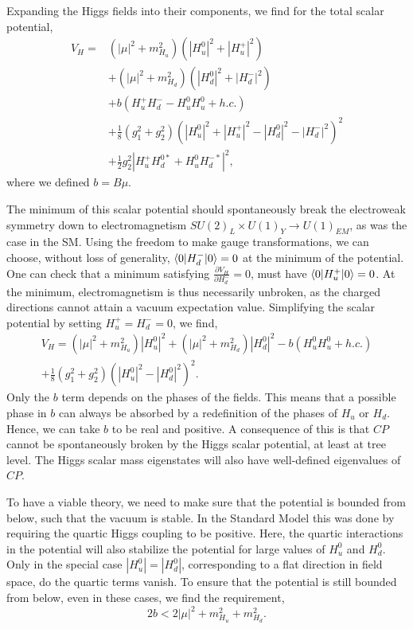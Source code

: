 Expanding the Higgs fields into their components, we find for the total scalar potential,
\begin{align}
  V_H = & \left( |\mu|^2 + m_{H_u}^2 \right)\left( |H_u^0|^2 + |H_u^+|^2 \right) \\
	& + \left( |\mu|^2 + m_{H_d}^2 \right)\left( |H_d^0|^2 + |H_d^-|^2 \right) \\
     & + b\left( H_u^+ H_d^- - H_u^0 H_u^0 + h.c.\right)  \\
     & + \frac{1}{8} \left( g_1^2 + g_2^2 \right) \left( |H_u^0|^2 + |H_u^+|^2 - |H_d^0|^2 -
|H_d^-|^2 \right)^2 \\
    & + \frac{1}{2} g_2^2 |H_u^+ H_d^{0*} + H_u^0 H_d^{-*}|^2 ,
\end{align}
where we defined $b = B \mu$.


The minimum of this scalar potential should spontaneously break the electroweak symmetry down to
electromagnetism $SU(2)_L \times U(1)_Y \rightarrow U(1)_{EM}$, as was the case in the SM. 
Using the freedom to make gauge transformations, we can choose, without loss of generality,
$\braket{0|H_d^-|0} = 0$ at the minimum of the potential. 
One can check that a minimum satisfying $\frac{\partial V_H}{\partial H_d^-} = 0$, must have
$\braket{0|H_u^+|0} = 0$. At the minimum, electromagnetism is thus necessarily unbroken, as the
charged directions cannot attain a vacuum expectation value.
Simplifying the scalar potential by setting $H_u^+ = H_d^- = 0$, we find,
\begin{multline}
  V_H = \left( |\mu|^2 + m_{H_u}^2 \right) |H_u^0|^2  + \left( |\mu|^2 + m_{H_d}^2 \right)
|H_d^0|^2 - b\left( H_u^0 H_u^0 + h.c.\right)  \\
      + \frac{1}{8} \left( g_1^2 + g_2^2 \right) \left( |H_u^0|^2  - |H_d^0|^2 \right)^2 .
\end{multline}
Only the $b$ term depends on the phases of the fields. This means that a possible phase in $b$ can
always be absorbed by a redefinition of the phases of $H_u$ or $H_d$. Hence, we can take $b$ to be
real and positive. A consequence of this is that $CP$ cannot be spontaneously broken by the Higgs
scalar potential, at least at tree level. The Higgs scalar mass eigenstates will also have
well-defined eigenvalues of $CP$. 

To have a viable theory, we need to make sure that the potential is bounded from below, such that
the vacuum is stable. 
In the Standard Model this was done by requiring the quartic Higgs coupling to be positive. 
Here, the quartic interactions in the potential will also stabilize the potential for large values
of $H_u^0$ and $H_d^0$. Only in the special case $|H_u^0| = |H_d^0|$, corresponding to a flat
direction in field space, do the quartic terms vanish. To ensure that the potential is still bounded
from below, even in these cases, we find the requirement,
\begin{equation}
  2b < 2 |\mu|^2 + m_{H_u}^2 + m_{H_d}^2 .
\end{equation}

